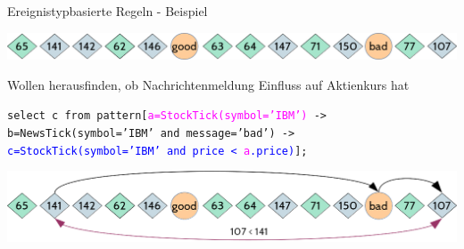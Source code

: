 \documentclass[usenames,dvipsnames]{beamer}
\begin{document}
\begin{frame}{Ereignistypbasierte Regeln - Beispiel}
\begin{center}
    \includegraphics[scale=0.4]{img/stream-2}
\end{center}

\begin{block}{}
    \centering
    Wollen herausfinden, ob Nachrichtenmeldung Einfluss auf Aktienkurs hat
\end{block}

\begin{exampleblock}{}
    \begin{center}
    \texttt{select c from pattern[\textcolor{Magenta}{a=StockTick(symbol='IBM')} ->\\
    \textcolor{Bittersweet}{b=NewsTick(symbol='IBM' and message='bad')} ->\\
    \textcolor{blue}{c=StockTick(symbol='IBM' and price < 
    \textcolor{Magenta}{a}.price)}];} 
    \end{center}
 
\end{exampleblock}

\begin{center}
    \includegraphics[scale=0.4]{img/solution-g}
\end{center}
\end{frame}
\end{document}
